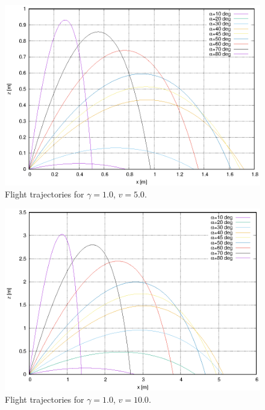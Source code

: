 \documentclass[11pt,a4paper]{article}
\begin{document}
\begin{figure}[ht]
\begin{center}
\includegraphics[scale=1.2]{figure1_1.eps} 
\end{center}
\caption{Flight trajectories for $\gamma = 1.0$, $v= 5.0$.}
\label{fig:1_1}
\end{figure}

\begin{figure}[ht]
\begin{center}
\includegraphics[scale=1.2]{figure1_2.eps} 
\end{center}
\caption{Flight trajectories for $\gamma = 1.0$, $v= 10.0$.}
\label{fig:1_2}
\end{figure}
\end{document}
